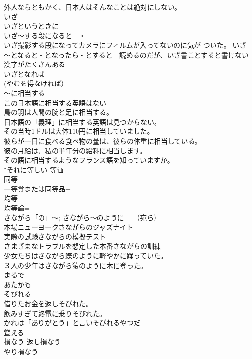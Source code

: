 \documentclass[8pt]{extreport}
\begin{document}
\begin{CJK}{UTF8}{min}
\\	外人ならともかく、日本人はそんなことは絶対にしない。
\\	いざ 
\\	いざというときに 
\\	いざ～する段になると　・　
\\	いざ撮影する段になってカメラにフィルムが入ってないのに気が ついた。 いざ～となると・となったら・とすると　読めるのだが、いざ書ことすると書けない漢字がたくさんある 
\\	いざとなれば 
\\	(やむを得なければ） 
\\	～に相当する 
\\	この日本語に相当する英語はない
\\	鳥の羽は人間の腕と足に相当する。 
\\	日本語の「義理」に相当する英語は見つからない。 
\\	その当時1ドルは大体110円に相当していました。 
\\	彼らが一日に食べる食べ物の量は、彼らの体重に相当している。 
\\	彼の月給は、私の半年分の給料に相当します。 
\\	その語に相当するようなフランス語を知っていますか。 
\\	"それに等しい 等価 
\\	同等 
\\	一等賞または同等品=
\\	均等 
\\	均等論=
\\	さながら「の」～; さながら～のように　 （宛ら）	
\\	本場ニューヨークさながらのジャズナイト 
\\	実際の試験さながらの模擬テスト 
\\	さまざまなトラブルを想定した本番さながらの訓練 
\\	少女たちはさながら蝶のように軽やかに踊っていた。 
\\	３人の少年はさながら猿のように木に登った。 
\\	まるで 
\\	あたかも 
\\	そびれる	
\\	借りたお金を返しそびれた。 
\\	飲みすぎて終電に乗りそびれた。 
\\	かれは「ありがとう」と言いそびれるやつだ	
\\	聳える 
\\	損なう 返し損なう 
\\	やり損なう 

\end{CJK}
\end{document}
